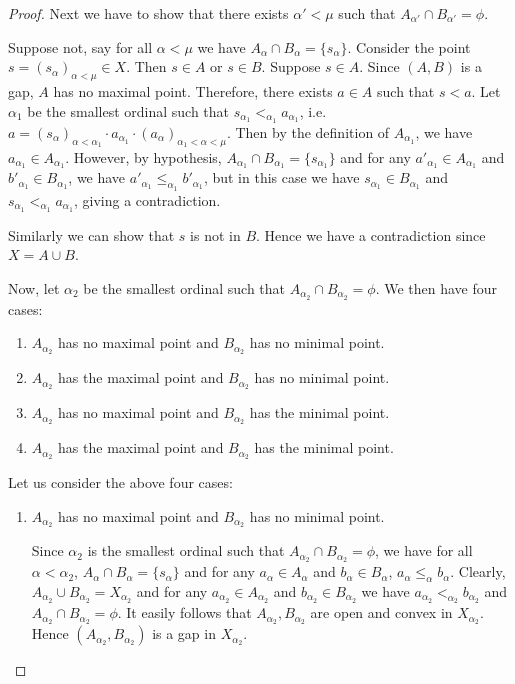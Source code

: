 \documentclass[12pt,oneside,english]{amsbook}
\numberwithin{equation}{section} %
\numberwithin{figure}{section} %
\theoremstyle{plain}
\numberwithin{section}{chapter}
\theoremstyle{plain}
\begin{document}
\begin{proof}
  Next we have to show that there exists $\alpha' < \mu$ such that $A_{{\alpha}'} \cap B_{{\alpha}'}  =  \phi$.

  Suppose not, say for all $\alpha < \mu$ we have $A_{\alpha} \cap B_{\alpha}  =  \{s_{\alpha}\}$. Consider the point $s  =  (s_{\alpha})_{\alpha < \mu}  \in X$. Then $s  \in A$ or $s  \in B$. Suppose $s  \in A$. Since $(A,B)$ is a gap, $A$ has no maximal point. Therefore, there exists $a  \in A$ such that $s < a$. Let $\alpha_{1}$ be the smallest ordinal such that $s_{\alpha_{1}} <_{\alpha_1} a_{\alpha_{1}}$, i.e. $a  =  (s_{\alpha})_{\alpha < \alpha_{1}} \cdot a_{\alpha_{1}} \cdot (a_{\alpha})_{\alpha_{1} < \alpha < \mu}$. Then by the definition of $A_{\alpha_{1}}$, we have $a_{\alpha_{1}} \in A_{\alpha_{1}}$. However, by hypothesis, $A_{\alpha_{1}} \cap B_{\alpha_{1}}  =  \{s_{\alpha_{1}} \}$ and for any $a'_{\alpha_{1}}  \in A_{\alpha_{1}}$ and $b'_{\alpha_{1}} \in B_{\alpha_{1}}$, we have $a'_{\alpha_{1}} \leq_{\alpha_1} b'_{\alpha_{1}}$, but in this case we have $s_{\alpha_{1}}  \in B_{\alpha_{1}}$ and $s_{\alpha_{1}} <_{\alpha_1} a_{\alpha_{1}}$, giving a contradiction.

  Similarly we can show that $s$ is not in $B$. Hence we have a contradiction since $X  =  A \cup B$.


Now, let $\alpha_{2}$ be the smallest ordinal such that $A_{\alpha_{2}} \cap B_{\alpha_{2}} = \phi$. We then have four cases:
\begin{enumerate}
\item $A_{\alpha_{2}}$ has no maximal point and $B_{\alpha_{2}}$ has no minimal point.
\item $A_{\alpha_{2}}$ has the maximal point and $B_{\alpha_{2}}$ has no minimal point.
\item $A_{\alpha_{2}}$ has no maximal point and $B_{\alpha_{2}}$ has the minimal point.
\item $A_{\alpha_{2}}$ has the maximal point and $B_{\alpha_{2}}$ has the minimal point. 
\end{enumerate}
Let us consider the above four cases:
\begin{enumerate}
\item $A_{\alpha_{2}}$ has no maximal point and $B_{\alpha_{2}}$ has no minimal point.
  
  Since $\alpha_{2}$ is the smallest ordinal such that $A_{\alpha_{2}} \cap B_{\alpha_{2}}  =  \phi$, we have for all $\alpha < \alpha_{2}$, $A_{\alpha} \cap B_{\alpha} =  \{s_{\alpha} \}$ and for any $a_{\alpha} \in A_{\alpha}$ and $b_{\alpha} \in B_{\alpha}$, $a_{\alpha} \leq_{\alpha} b_{\alpha}$. Clearly, $A_{\alpha_{2}} \cup B_{\alpha_{2}}  =  X_{\alpha_{2}}$ and for any $a_{\alpha_{2}} \in A_{\alpha_{2}}$ and $b_{\alpha_{2}}  \in B_{\alpha_{2}}$ we have $a_{\alpha_{2}} <_{\alpha_2} b_{\alpha_{2}}$ and $A_{\alpha_{2}} \cap B_{\alpha_{2}}  =  \phi$. It easily follows that $A_{\alpha_{2}}, B_{\alpha_{2}}$ are open and convex in $X_{\alpha_{2}}$. Hence $(A_{\alpha_{2}}, B_{\alpha_{2}})$ is a gap in $X_{\alpha_{2}}$.


\end{enumerate}
\end{proof}
\end{document}
